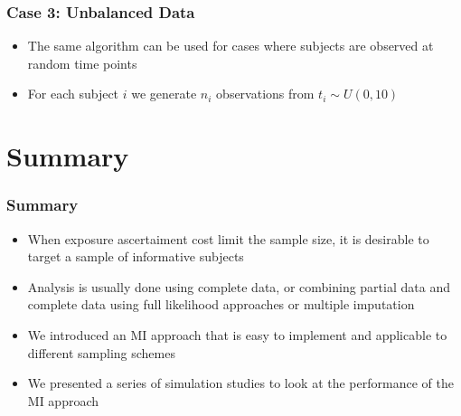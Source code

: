\documentclass[pdf]{beamer}
\begin{document}
\begin{frame}
\frametitle{Case 3: Unbalanced Data}
\begin{itemize}
	\item The same algorithm can be used for cases where subjects are observed at random time points
	\item For each subject $i$ we generate $n_i$ observations from $t_i \sim U(0, 10)$
	\begin{table}[H]
		\centering
	\end{table}
\end{itemize}
\end{frame}


\section{Summary}
\begin{frame}
\frametitle{Summary}
\begin{itemize}
		\setlength\itemsep{0.8em}
		\item When exposure ascertaiment cost limit the sample size, it is desirable to target a sample of informative subjects
		\item Analysis is usually done using complete data, or combining partial data and complete data using full likelihood approaches or multiple imputation
		\item We introduced an MI approach that is easy to implement and applicable to different sampling schemes
		\item We presented a series of simulation studies to look at the performance of the MI approach
\end{itemize}
\end{frame}
\end{document}
